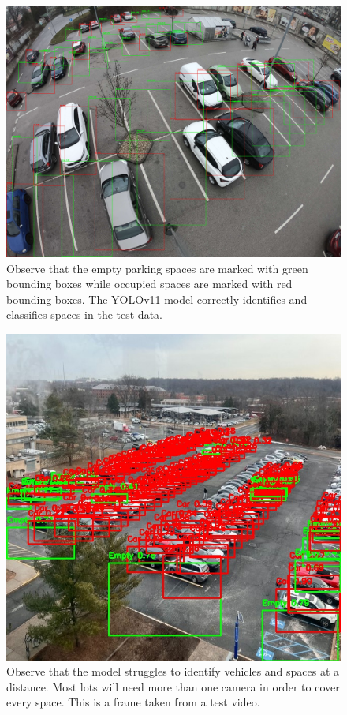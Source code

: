 \documentclass[conference]{IEEEtran}
\begin{document}
\begin{figure}[h]
    \centering
    \includegraphics[scale=0.065]{Figure_4.JPG}
    \caption{
        Observe that the empty parking spaces are marked with green bounding boxes while occupied spaces are marked with red bounding boxes. 
        The YOLOv11 model correctly identifies and classifies spaces in the test data.
    }
    \label{fig:fig4}
\end{figure}

\begin{figure}[h]
    \centering
    \includegraphics[scale=0.4]{Figure_5.JPG}
    \caption{
        Observe that the model struggles to identify vehicles and spaces at a distance. 
        Most lots will need more than one camera in order to cover every space. 
        This is a frame taken from a test video.   
    }
    \label{fig:fig5}
\end{figure}
\end{document}
